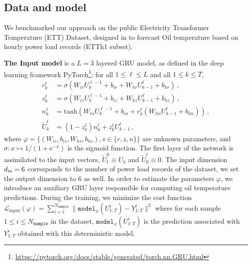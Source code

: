 \documentclass[conference]{IEEEtran}
\begin{document}
\subsection{Data and model}
\label{sub:data}
We benchmarked our approach on the public Electricity Transformer Temperature (ETT) Dataset, designed in \cite{Zhou2021Informer} to forecast Oil temperature based on hourly power load records (ETTh1 subset).
%

\textbf{The Input model} is a $L=3$ layered GRU model, as defined in the deep learning framework PyTorch\footnote{\href{https://pytorch.org/docs/stable/generated/torch.nn.GRU.html}{https://pytorch.org/docs/stable/generated/torch.nn.GRU.html}}: for all $1 \leq \ell \leq L$ and all $1 \leq k \leq T$,
\begin{align*}
	r^\ell_k        & = \sigma(W_{ir} U^{\ell - 1}_k + b_{ir} + W_{hr} U^{\ell}_{k-1} + b_{hr}) \,,                \\
	z^\ell_k        & = \sigma(W_{iz} U^{\ell - 1}_k + b_{iz} + W_{hz} U^{\ell}_{k-1} + b_{hz}) \,,                \\
	n^\ell_k        & = \mathrm{tanh}(W_{in} U^{\ell - 1}_k + b_{in} + r^\ell_k (W_{hn} U^\ell_{k-1} + b_{hn}))\,, \\
	\tilde U^\ell_k & = (1-z^\ell_k) n^\ell_k+z^\ell_k U^\ell_{k-1}\,,
\end{align*}
where $\varphi = \{(W_{is}, b_{is}, W_{hs}, b_{hs}), s \in \{r, z, n\}\}$ are unknown parameters, and $\sigma: x \mapsto 1/(1+\mathrm{e}^{-x})$ is the sigmoid function.
The first layer of the network is assimilated to the input vectors, $\widetilde U_t^0 \equiv U_k$ and $\widetilde U^\ell_0 \equiv 0$.
The input dimension $d_\textnormal{in}=6$ corresponds to the number of power load records of the dataset, we set the output dimension to 6 as well.
In order to estimate the parameters $\varphi$, we introduce an auxiliary GRU layer responsible for computing oil temperature predictions.
During the training, we minimize the cost function $\mathcal{L}_{\mathrm{input}}(\varphi) = \sum_{i=1}^{N_{\texttt{sample}}} \|\texttt{model}_{\varphi}(U^i_{1:T}) - Y^i_{1:T}\|^2$ where for each sample $1 \leq i \leq N_{\texttt{sample}}$ in the dataset, $\texttt{model}_\varphi(U^i_{1:T})$ is the prediction associated with $Y^i_{1:T}$ obtained with this deterministic model.
\end{document}
